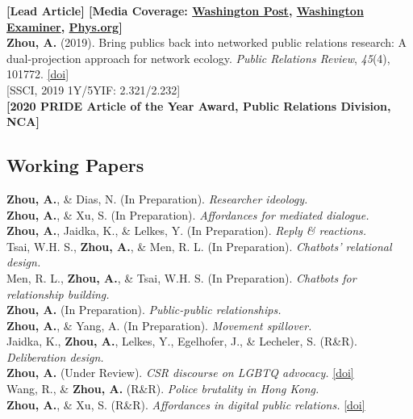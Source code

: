 \documentclass[12pt, letterpaper]{article}
\newcommand{\doi}[1]{\href{#1}{{[doi]}}}
\newcommand{\years}[1]{\marginnote{\normalsize #1}}
\begin{document}
  \years{} {\textbf{[Lead Article] [Media Coverage: \href{https://www.washingtonpost.com/politics/2019/09/17/twitter-got-somewhat-more-civil-when-tweets-doubled-length-heres-how-we-know}{Washington Post}, \href{https://www.washingtonexaminer.com/opinion/twitter-conversations-have-improved-but-theres-a-better-way-to-talk-to-each-other}{Washington Examiner}, \href{https://phys.org/news/2019-09-character-limit-twitter-civil.html}{Phys.org}]}\\
  \years{[1]} \textbf{Zhou, A.} (2019). Bring publics back into networked public relations research: A dual-projection approach for network ecology. \textit{Public Relations Review}, \textit{45}(4), 101772. \doi{https://doi.org/10.1016/j.pubrev.2019.03.004}\\
  \years{} {[SSCI, 2019 1Y/5YIF: 2.321/2.232]}\\
  \years{} {\textbf{[2020 PRIDE Article of the Year Award, Public Relations Division, NCA]}}

\subsection*{Working Papers}

\years{[11]} \textbf{Zhou, A.}, \& Dias, N. (In Preparation). \textit{Researcher ideology.}\\
\years{[10]} \textbf{Zhou, A.}, \& Xu, S. (In Preparation). \textit{Affordances for mediated dialogue.}\\
\years{[9]} \textbf{Zhou, A.}, Jaidka, K., \& Lelkes, Y. (In Preparation). \textit{Reply \& reactions.}\\
\years{[8]} Tsai, W.H. S., \textbf{Zhou, A.}, \&  Men, R. L. (In Preparation). \textit{Chatbots' relational design.}\\
\years{[7]} Men, R. L., \textbf{Zhou, A.}, \& Tsai, W.H. S. (In Preparation). \textit{Chatbots for relationship building.}\\
\years{[6]} \textbf{Zhou, A.} (In Preparation). \textit{Public-public relationships.}\\
\years{[5]} \textbf{Zhou, A.}, \& Yang, A. (In Preparation). \textit{Movement spillover.}\\
\years{[4]} Jaidka, K., \textbf{Zhou, A.}, Lelkes, Y., Egelhofer, J., \& Lecheler, S. (R\&R). \textit{Deliberation design.}\\
\years{[3]} \textbf{Zhou, A.} (Under Review). \textit{CSR discourse on LGBTQ advocacy.} \doi{https://doi.org/10.31219/osf.io/gz7bw}\\
\years{[2]} Wang, R., \& \textbf{Zhou, A.} (R\&R). \textit{Police brutality in Hong Kong.}\\
\years{[1]} \textbf{Zhou, A.}, \& Xu, S. (R\&R). \textit{Affordances in digital public relations.} \doi{https://doi.org/10.31235/osf.io/uzhk9}

}
\end{document}
